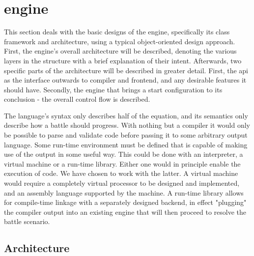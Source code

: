 \section{\langname{} engine}
This section deals with the basic designs of the engine, specifically its class framework and architecture, using a typical object-oriented design approach. First, the engine's overall architecture will be described, denoting the various layers in the structure with a brief explanation of their intent. Afterwards, two specific parts of the architecture will be described in greater detail. First, the \ac{api} as the interface outwards to compiler and frontend, and any desirable features it should have. Secondly, the engine that brings a start configuration to its conclusion - the overall control flow is described.

The language's syntax only describes half of the equation, and its semantics only describe how a battle should progress. With nothing but a compiler it would only be possible to parse and validate code before passing it to some arbitrary output language. Some run-time environment must be defined that is capable of making use of the output in some useful way. This could be done with an interpreter, a virtual machine or a run-time library. Either one would in principle enable the execution of code. We have chosen to work with the latter. A virtual machine would require a completely virtual processor to be designed and implemented, and an assembly language supported by the machine.
A run-time library allows for compile-time linkage with a separately designed backend, in effect "plugging" the \langname{} compiler output into an existing engine that will then proceed to resolve the battle scenario.

\subsection*{Architecture}


